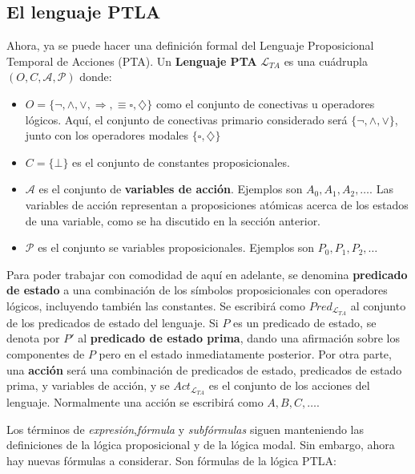 \subsection{El lenguaje PTLA}\label{subsection:TLAlanguage}
Ahora, ya se puede hacer una definición formal del Lenguaje Proposicional Temporal de Acciones (PTA). Un \textbf{Lenguaje PTA} $\mathcal{L}_{TA}$ es una cuádrupla $(O,C,\mathcal{A},\mathcal{P})$ donde:

\begin{itemize}
    \item $O = \lbrace \neg, \land, \lor, \Rightarrow, \equiv \square, \diamondsuit \rbrace$ como el conjunto de conectivas u operadores lógicos. Aquí, el conjunto de conectivas primario considerado será $\lbrace \neg, \land, \lor \rbrace$, junto con los operadores modales $\lbrace \square, \diamondsuit \rbrace$
    \item $C = \lbrace \bot \rbrace$ es el conjunto de constantes proposicionales.
    \item $\mathcal{A}$ es el conjunto de \textbf{variables de acción}. Ejemplos son $A_0,A_1,A_2,\ldots$. Las variables de acción representan a proposiciones atómicas acerca de los estados de una variable, como se ha discutido en la sección anterior.
    \item $\mathcal{P}$ es el conjunto se variables proposicionales. Ejemplos son $P_0,P_1,P_2,\ldots$
\end{itemize}

Para poder trabajar con comodidad de aquí en adelante, se denomina \textbf{predicado de estado} a una combinación de los símbolos proposicionales con operadores lógicos, incluyendo también las constantes. Se escribirá como $Pred_{\mathcal{L}_{TA}}$ al conjunto de los predicados de estado del lenguaje. Si $P$ es un predicado de estado, se denota por $P'$ al \textbf{predicado de estado prima}, dando una afirmación sobre los componentes de $P$ pero en el estado inmediatamente posterior. Por otra parte, una \textbf{acción} será una combinación de predicados de estado, predicados de estado prima, y variables de acción, y se $Act_{\mathcal{L}_{TA}}$ es el conjunto de los acciones del lenguaje. Normalmente una acción se escribirá como $A,B,C, \ldots$.

Los términos de \textit{expresión},\textit{fórmula} y \textit{subfórmulas} siguen manteniendo las definiciones de la lógica proposicional y de la lógica modal. Sin embargo, ahora hay nuevas fórmulas a considerar. Son fórmulas de la lógica PTLA:

